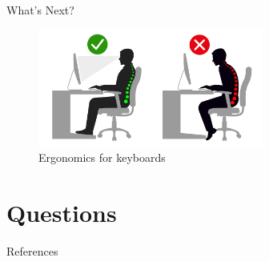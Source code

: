 \documentclass{beamer}
\begin{document}
    \begin{frame}{What's Next?}
        \begin{figure}
            \centering
            \includegraphics[width=20em, keepaspectratio]{images/ergonomic.png}
            \caption{Ergonomics for keyboards \cite{ergonomics}}
        \end{figure}
    \end{frame}

    \section{Questions}
    
    \begin{frame}[allowframebreaks]{References}
        
        
    \end{frame}
    
\end{document}
